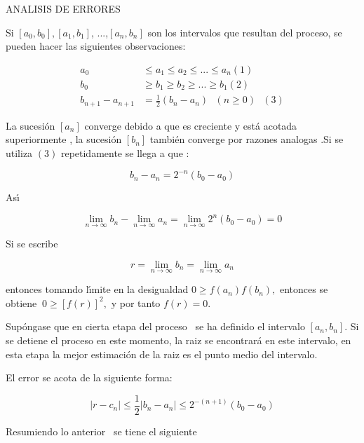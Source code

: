 \documentclass{article}%
\begin{document}
\bigskip

ANALISIS DE ERRORES

\bigskip Si $\left[  a_{0},b_{0}\right]  ,\left[  a_{1},b_{1}\right]  $,
...,$\left[  a_{n},b_{n}\right]  $ son los intervalos que resultan del
proceso, se pueden hacer las siguientes observaciones:%

\begin{align*}
a_{0}  & \leqslant a_{1}\leqslant a_{2}\leqslant...\leqslant a_{n}\text{
}\left(  1\right) \\
b_{0}  & \geqslant b_{1}\geqslant b_{2}\geqslant...\geqslant b_{1}\text{
}\left(  2\right) \\
b_{n+1}-a_{n+1}  & =\frac{1}{2}\left(  b_{n}-a_{n}\right)  \text{ \ \ }\left(
n\geqslant0\right)  \text{ }\left(  3\right)
\end{align*}

La sucesi\'{o}n $\left[  a_{n}\right]  $ converge debido a que es creciente y
est\'{a} acotada superiormente , la sucesi\'{o}n $\left[  b_{n}\right]  $
tambi\'{e}n converge por razones analogas .Si se utiliza $\left(  3\right)  $
repetidamente se llega a que :%

\[
b_{n}-a_{n}=2^{-n}\left(  b_{0}-a_{0}\right)
\]

As\'{\i}%

\[
\lim_{n\rightarrow\infty}b_{n}-\lim_{n\rightarrow\infty}a_{n}=\lim
_{n\rightarrow\infty}2^{n}\left(  b_{0}-a_{0}\right)  =0
\]

Si se escribe%

\[
r=\lim_{n\rightarrow\infty}b_{n}=\lim_{n\rightarrow\infty}a_{n}%
\]

entonces tomando l\'{\i}mite en la desigualdad $0\geqslant f\left(
a_{n}\right)  f\left(  b_{n}\right)  ,$ entonces se obtiene $\ 0\geqslant
\left[  f\left(  r\right)  \right]  ^{2},$ y por tanto $f\left(  r\right)  =0.$

\bigskip

Sup\'{o}ngase que en cierta etapa del proceso \ se ha definido el intervalo
$\left[  a_{n},b_{n}\right]  .$ Si se detiene el proceso en este momento, la
raiz se encontrar\'{a} en este intervalo, en esta etapa la mejor
estimaci\'{o}n de la raiz es el punto medio del intervalo.

El error se acota de la siguiente forma:%

\[
\left|  r-c_{n}\right|  \leq\frac{1}{2}\left|  b_{n}-a_{n}\right|
\leq2^{-\left(  n+1\right)  }\left(  b_{0}-a_{0}\right)
\]

Resumiendo lo anterior \ se tiene el siguiente
\end{document}
